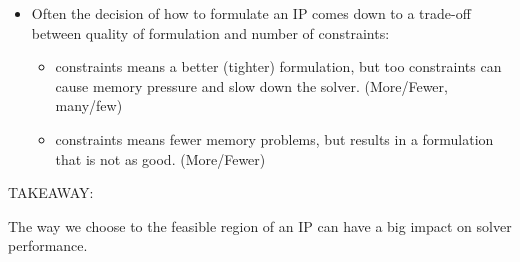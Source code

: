 \documentclass[11pt]{article}
\theoremstyle{definition}
\newcommand{\answerbox}[3]{%
  \fbox{%
    \begin{minipage}[#1]{#2}
      \hfill\vspace{#3}
    \end{minipage}
  }
}
\newcommand{\wordbox}{\answerbox{c}{1.2in}{.7cm}}
\newcommand{\catbox}{\answerbox{c}{.5in}{.7cm}}
\begin{document}
\begin{itemize}
\item Often the decision of how to formulate an IP comes down to a trade-off between quality of formulation and number of constraints:
\begin{itemize}
\item \wordbox constraints means a better (tighter) formulation, but too \catbox constraints can cause memory pressure and slow down the solver.  (More/Fewer, many/few)
\item \wordbox constraints means fewer memory problems, but results in a formulation that is not as good.  (More/Fewer)
\end{itemize}
\end{itemize}

\bigskip
TAKEAWAY:

\begin{tcolorbox}
The way we choose to \wordbox the feasible region of an IP can have a big impact on solver performance.
\end{tcolorbox}

\vfill
\end{document}
